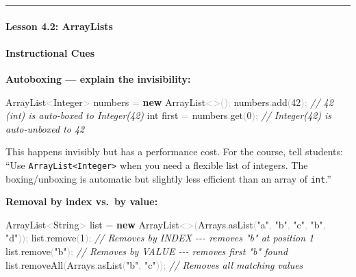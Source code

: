 \documentclass[
  justified,
  openright,
]{tufte-book}
\let\subsection\paragraph
\let\paragraph\paragraph
\newcommand{\KeywordTok}[1]{\textcolor{CodeKeyword}{\textbf{#1}}}  %
\newcommand{\StringTok}[1]{\textcolor{CodeString}{#1}}              %
\newcommand{\CommentTok}[1]{\textcolor{CodeComment}{\textit{#1}}}  %
\newcommand{\CodeNumTok}[1]{\textcolor{CodeNumber}{#1}}             %
\newcommand{\CodeFuncTok}[1]{\textcolor{CodeKeyword}{#1}}           %
\newcommand{\CodeTypeTok}[1]{\textcolor{CodeType}{#1}}              %
\newcommand{\OperatorTok}[1]{\textcolor{DarkGray}{#1}}              %
\newenvironment{Shaded}{%
  \begin{mdframed}[style=TufteCode]%
}{%
  \end{mdframed}%
}
\let\subsection\paragraph
\let\paragraph\paragraph
\begin{document}
\begin{center}\rule{0.5\linewidth}{0.5pt}\end{center}

\subsection{Lesson 4.2: ArrayLists}\label{lesson-4.2-arraylists}

\paragraph{Instructional Cues}\label{instructional-cues-27}

\textbf{Autoboxing --- explain the invisibility:}

\begin{Shaded}
\begin{Highlighting}[]
ArrayList\OperatorTok{\textless{}}Integer\OperatorTok{\textgreater{}} numbers \OperatorTok{=} \KeywordTok{new} ArrayList\OperatorTok{\textless{}\textgreater{}();}
numbers\OperatorTok{.}\CodeFuncTok{add}\OperatorTok{(}\CodeNumTok{42}\OperatorTok{);}        \CommentTok{// 42 (int) is auto{-}boxed to Integer(42)}
\CodeTypeTok{int} first \OperatorTok{=} numbers\OperatorTok{.}\CodeFuncTok{get}\OperatorTok{(}\CodeNumTok{0}\OperatorTok{);}  \CommentTok{// Integer(42) is auto{-}unboxed to 42}
\end{Highlighting}
\end{Shaded}

This happens invisibly but has a performance cost. For the course, tell
students: ``Use \texttt{ArrayList\textless{}Integer\textgreater{}} when
you need a flexible list of integers. The boxing/unboxing is automatic
but slightly less efficient than an array of \texttt{int}.''

\textbf{Removal by index vs.~by value:}

\begin{Shaded}
\begin{Highlighting}[]
ArrayList\OperatorTok{\textless{}}String\OperatorTok{\textgreater{}} list \OperatorTok{=} \KeywordTok{new} ArrayList\OperatorTok{\textless{}\textgreater{}(}Arrays\OperatorTok{.}\CodeFuncTok{asList}\OperatorTok{(}\StringTok{"a"}\OperatorTok{,} \StringTok{"b"}\OperatorTok{,} \StringTok{"c"}\OperatorTok{,} \StringTok{"b"}\OperatorTok{,} \StringTok{"d"}\OperatorTok{));}
list\OperatorTok{.}\CodeFuncTok{remove}\OperatorTok{(}\CodeNumTok{1}\OperatorTok{);}            \CommentTok{// Removes by INDEX {-}{-}{-} removes "b" at position 1}
list\OperatorTok{.}\CodeFuncTok{remove}\OperatorTok{(}\StringTok{"b"}\OperatorTok{);}          \CommentTok{// Removes by VALUE {-}{-}{-} removes first "b" found}
list\OperatorTok{.}\CodeFuncTok{removeAll}\OperatorTok{(}Arrays\OperatorTok{.}\CodeFuncTok{asList}\OperatorTok{(}\StringTok{"b"}\OperatorTok{,} \StringTok{"c"}\OperatorTok{));}  \CommentTok{// Removes all matching values}
\end{Highlighting}
\end{Shaded}
\end{document}
